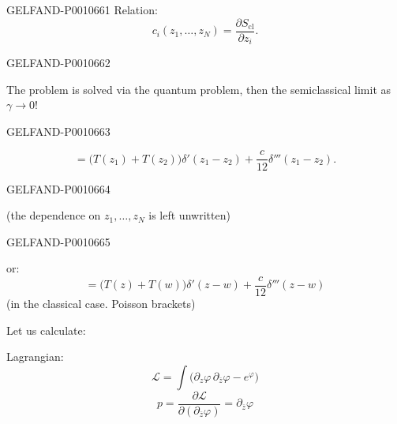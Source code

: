 \begin{GelfandAdjacentEvidence}{GELFAND-P001066}{1}
Relation:
\begin{equation*}
c_i(z_1,\ldots,z_N)=\frac{\partial S_{\mathrm{cl}}}{\partial z_i}.
\tag{14}
\end{equation*}
\end{GelfandAdjacentEvidence}
\begin{GelfandAdjacentEvidence}{GELFAND-P001066}{2}


The problem is solved via the quantum problem, then the semiclassical limit as \(\gamma\to0\)!
\end{GelfandAdjacentEvidence}
\begin{GelfandAdjacentEvidence}{GELFAND-P001066}{3}

\begin{equation*}
[T(z_1),T(z_2)]
  =\bigl(T(z_1)+T(z_2)\bigr)\delta'(z_1-z_2)
   +\frac{c}{12}\delta'''(z_1-z_2).
\tag{15}
\end{equation*}
\end{GelfandAdjacentEvidence}
\begin{GelfandAdjacentEvidence}{GELFAND-P001066}{4}


(the dependence on \(z_1,\ldots,z_N\) is left unwritten)
\end{GelfandAdjacentEvidence}
\begin{GelfandAdjacentEvidence}{GELFAND-P001066}{5}


or:
\begin{equation*}
[T(z),T(w)]
  =\bigl(T(z)+T(w)\bigr)\delta'(z-w)
   +\frac{c}{12}\delta'''(z-w)
\tag{15}
\end{equation*}
(in the classical case. Poisson brackets)

Let us calculate:

Lagrangian:
\[
\mathcal L=\int\bigl(\partial_z\varphi\,\partial_{\bar z}\varphi-e^\varphi\bigr)
\]
\begin{equation*}
p=\frac{\partial\mathcal L}{\partial(\partial_{\bar z}\varphi)}
  =\partial_{\bar z}\varphi
\tag{16}
\end{equation*}
\end{GelfandAdjacentEvidence}
